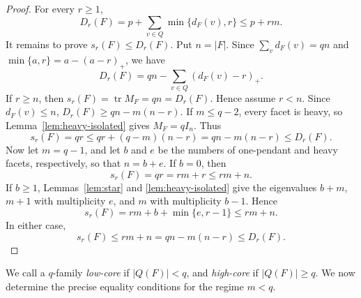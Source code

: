 \documentclass[11pt]{article}
\newcommand{\tr}{\operatorname{tr}}
\begin{document}
\begin{proof}
	For every $r\ge1$,
	\[
	D_r(F)=p+\sum_{v\in Q}\min\{d_F(v),r\}\le p+rm.
	\]
	It remains to prove $s_r(F)\le D_r(F)$.
	Put $n=|F|$. Since $\sum_v d_F(v)=qn$ and
	$\min\{a,r\}=a-(a-r)_+$, we have
	\[
	D_r(F)=qn-\sum_{v\in Q}(d_F(v)-r)_+.
	\]
	If $r\ge n$, then $s_r(F)=\tr M_F=qn=D_r(F)$. Hence assume $r<n$.
	Since $d_F(v)\le n$, $D_r(F)\ge qn-m(n-r).$
	If $m\le q-2$, every facet is heavy, so
	Lemma~\ref{lem:heavy-isolated} gives $M_F=qI_n$. Thus
	\[
	s_r(F)=qr\le qr+(q-m)(n-r)=qn-m(n-r)\le D_r(F).
	\]
	Now let $m=q-1$, and let $b$ and $e$ be the numbers of one-pendant
	and heavy facets, respectively, so that $n=b+e$. If $b=0$, then
	\[
	s_r(F)=qr=rm+r\le rm+n.
	\]
	If $b\ge1$, Lemmas~\ref{lem:star} and \ref{lem:heavy-isolated} give
	the eigenvalues $b+m$, $m+1$ with multiplicity $e$, and $m$ with
	multiplicity $b-1$. Hence
	\[
	s_r(F)
	=rm+b+\min\{e,r-1\}
	\le rm+n.
	\]
	In either case,
	\[
	s_r(F)\le rm+n=qn-m(n-r)\le D_r(F).
	\]
\end{proof}
	
We call a \(q\)-family \emph{low-core} if
	\(|Q(F)|<q\), and \emph{high-core} if \(|Q(F)|\ge q\).
We now determine the precise equality conditions for the regime $m < q$.	
\end{document}

